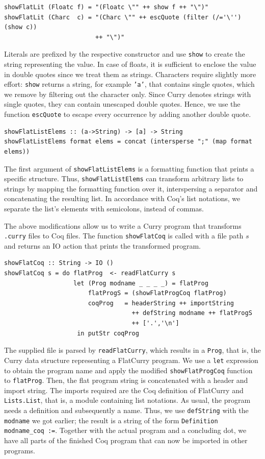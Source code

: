 \documentclass[fleqn, abstract=on]{scrreprt}
\newcommand{\coqinline}[1]{\texttt{#1}}
\begin{document}
\begin{verbatim}
showFlatLit (Floatc f) = "(Floatc \"" ++ show f ++ "\")"
showFlatLit (Charc  c) = "(Charc \"" ++ escQuote (filter (/='\'') (show c))
                         ++ "\")"
\end{verbatim}
Literals are prefixed by the respective constructor and use \texttt{show} to create the string representing the value. In case of floats, it is sufficient to enclose the value in double quotes since we treat them as strings. Characters require slightly more effort: \texttt{show} returns a string, for example \texttt{'a'}, that contains single quotes, which we remove by filtering out the character only. Since Curry denotes strings with single quotes, they can contain unescaped double quotes. Hence, we use the function \texttt{escQuote} to escape every occurrence by adding another double quote.\cite{CoqManualV8}
\begin{verbatim}
showFlatListElems :: (a->String) -> [a] -> String
showFlatListElems format elems = concat (intersperse ";" (map format elems))
\end{verbatim}
The first argument of \texttt{showFlatListElems} is a formatting function that prints a specific structure. Thus, \texttt{showFlatListElems} can transform arbitrary lists to strings by mapping the formatting function over it, interspersing a separator and concatenating the resulting list. In accordance with Coq's list notations, we separate the list's elements with semicolons, instead of commas.\\
\par\noindent
The above modifications allow us to write a Curry program that transforms \texttt{.curry} files to Coq files. The function \texttt{showFlatCoq} is called with a file path $s$ and returns an IO action that prints the transformed program. 
\begin{verbatim}
showFlatCoq :: String -> IO ()
showFlatCoq s = do flatProg  <- readFlatCurry s
                   let (Prog modname _ _ _ _) = flatProg
                       flatProgS = (showFlatProgCoq flatProg)
                       coqProg   = headerString ++ importString
                                   ++ defString modname ++ flatProgS
                                   ++ ['.','\n']
                    in putStr coqProg
\end{verbatim}
The supplied file is parsed by \texttt{readFlatCurry}, which results in a \texttt{Prog}, that is, the Curry data structure representing a FlatCurry program. We use a \texttt{let} expression to obtain the program name and apply the modified \texttt{showFlatProgCoq} function to \texttt{flatProg}. Then, the flat program string is concatenated with a header and import string. The imports required are the Coq definition of FlatCurry and \texttt{Lists.List}, that is, a module containing list notations.
As usual, the program needs a definition and subsequently a name. Thus, we use \texttt{defString} with the \texttt{modname} we got earlier; the result is a string of the form \coqinline{Definition modname_coq :=}. Together with the actual program and a concluding dot, we have all parts of the finished Coq program that can now be imported in other programs.
\end{document}
